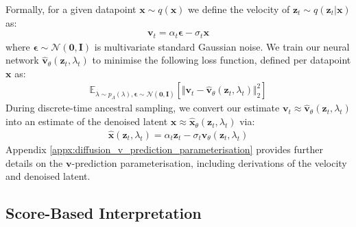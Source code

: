 \documentclass[ oneside,%
                    author={George Herbert},
                    degree={MSci},
                     title={Video Diffusion Models for Climate Simulations},
                  subtitle={}]{dissertation}
\begin{document}
Formally, for a given datapoint $\mathbf{x}\sim q(\mathbf{x})$  we define the velocity of $\mathbf{z}_t\sim q(\mathbf{z}_t|\mathbf{x})$ as:
\begin{align}
      \mathbf{v}_t=\alpha_t\boldsymbol\epsilon - \sigma_t\mathbf{x}
\end{align}
where $\boldsymbol\epsilon\sim\mathcal{N}(\mathbf{0}, \mathbf{I})$ is multivariate standard Gaussian noise. We train our neural network $\hat{\mathbf{v}}_\theta(\mathbf{z}_t,\lambda_t)$ to minimise the following loss function, defined per datapoint $\mathbf{x}$ as:
\begin{align}
      \mathbb{E}_{\lambda\sim p_\Lambda(\lambda),\boldsymbol\epsilon\sim\mathcal{N}(\mathbf{0},\mathbf{I})}\left[\Vert\mathbf{v}_t-\hat{\mathbf{v}}_\theta(\mathbf{z}_t, \lambda_t)\Vert_2^2\right]\label{eq:v_parameterisation_loss}
\end{align}
During discrete-time ancestral sampling, we convert our estimate $\mathbf{v}_t\approx\hat{\mathbf{v}}_\theta(\mathbf{z}_t,\lambda_t)$ into an estimate of the denoised latent $\mathbf{x}\approx\hat{\mathbf{x}}_\theta(\mathbf{z}_t,\lambda_t)$ via:
\begin{align}
      \hat{\mathbf{x}}(\mathbf{z}_t,\lambda_t)=\alpha_t\mathbf{z}_t-\sigma_t\hat{\mathbf{v}}_\theta(\mathbf{z}_t,\lambda_t)
\end{align}
Appendix \ref{appx:diffusion_v_prediction_parameterisation} provides further details on the $\mathbf{v}$-prediction parameterisation, including derivations of the velocity and denoised latent.

\subsection{Score-Based Interpretation}
\end{document}
